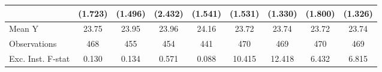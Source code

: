 {\begin{tabular}{l*{8}{c}}
                    &     (1.723)         &     (1.496)         &     (2.432)         &     (1.541)         &     (1.531)         &     (1.330)         &     (1.800)         &     (1.326)         \\
\midrule
Mean Y              &       23.75         &       23.95         &       23.96         &       24.16         &       23.72         &       23.74         &       23.72         &       23.74         \\
Observations        &         468         &         455         &         454         &         441         &         470         &         469         &         470         &         469         \\
Exc. Inst. F-stat   &       0.130         &       0.134         &       0.571         &       0.088         &      10.415         &      12.418         &       6.432         &       6.815         \\
\bottomrule
\end{tabular}
}

